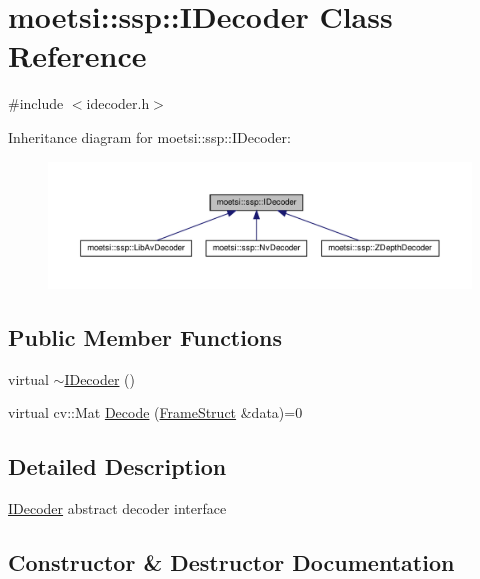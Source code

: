 \hypertarget{classmoetsi_1_1ssp_1_1IDecoder}{}\section{moetsi\+:\+:ssp\+:\+:I\+Decoder Class Reference}
\label{classmoetsi_1_1ssp_1_1IDecoder}


{\ttfamily \#include $<$idecoder.\+h$>$}



Inheritance diagram for moetsi\+:\+:ssp\+:\+:I\+Decoder\+:
\nopagebreak
\begin{figure}[H]
\begin{center}
\leavevmode
\includegraphics[width=350pt]{classmoetsi_1_1ssp_1_1IDecoder__inherit__graph}
\end{center}
\end{figure}
\subsection*{Public Member Functions}
\begin{DoxyCompactItemize}
\item 
virtual \hyperlink{classmoetsi_1_1ssp_1_1IDecoder_a26dc991c2434792f50ec5ae9b61a1653}{$\sim$\+I\+Decoder} ()
\item 
virtual cv\+::\+Mat \hyperlink{classmoetsi_1_1ssp_1_1IDecoder_a1c06604dc4107d3668a4e791c13cc063}{Decode} (\hyperlink{structmoetsi_1_1ssp_1_1FrameStruct}{Frame\+Struct} \&data)=0
\end{DoxyCompactItemize}


\subsection{Detailed Description}
\hyperlink{classmoetsi_1_1ssp_1_1IDecoder}{I\+Decoder} abstract decoder interface 

\subsection{Constructor \& Destructor Documentation}
\mbox{\label{classmoetsi_1_1ssp_1_1IDecoder_a26dc991c2434792f50ec5ae9b61a1653}} 
